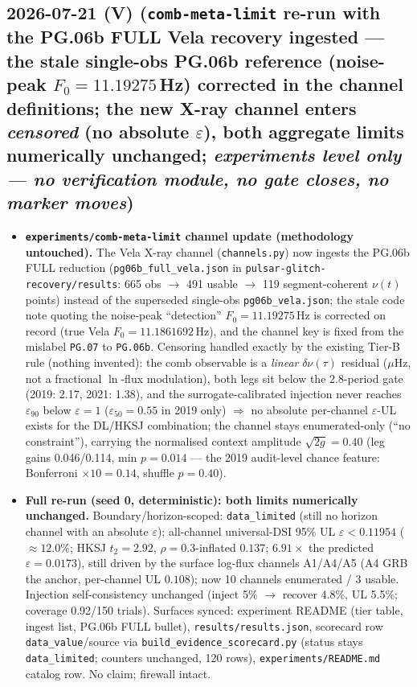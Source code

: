 \documentclass[11pt]{article}
\begin{document}
\subsection*{2026-07-21 (V) (\texttt{comb-meta-limit} re-run with the PG.06b FULL Vela recovery ingested --- the stale single-obs PG.06b reference (noise-peak $F_0=11.19275$\,Hz) corrected in the channel definitions; the new X-ray channel enters \emph{censored} (no absolute $\varepsilon$), both aggregate limits numerically unchanged; \emph{experiments level only --- no verification module, no gate closes, no marker moves})}
\begin{itemize}[leftmargin=1.5em]
\item \textbf{\texttt{experiments/comb-meta-limit} channel update (methodology untouched).} The Vela
X-ray channel (\texttt{channels.py}) now ingests the PG.06b FULL reduction
(\texttt{pg06b\_full\_vela.json} in \texttt{pulsar-glitch-recovery/results}: 665 obs $\to$ 491
usable $\to$ 119 segment-coherent $\nu(t)$ points) instead of the superseded single-obs
\texttt{pg06b\_vela.json};
the stale code note quoting the noise-peak ``detection'' $F_0=11.19275$\,Hz is corrected on record
(true Vela $F_0=11.1861692$\,Hz), and the channel key is fixed from the mislabel \texttt{PG.07} to
\texttt{PG.06b}. Censoring handled exactly by the existing Tier-B rule (nothing invented): the comb
observable is a \emph{linear} $\delta\nu(\tau)$ residual ($\mu$Hz, not a fractional $\ln$-flux
modulation), both legs sit below the 2.8-period gate (2019: 2.17, 2021: 1.38), and the
surrogate-calibrated injection never reaches $\varepsilon_{90}$ below $\varepsilon=1$
($\varepsilon_{50}=0.55$ in 2019 only) $\Rightarrow$ no absolute per-channel $\varepsilon$-UL exists
for the DL/HKSJ combination; the channel stays enumerated-only (``no constraint''), carrying the
normalised context amplitude $\sqrt{2g}=0.40$ (leg gains 0.046/0.114, min $p=0.014$ --- the 2019
audit-level chance feature: Bonferroni $\times10=0.14$, shuffle $p=0.40$).
\item \textbf{Full re-run (seed 0, deterministic): both limits numerically unchanged.}
Boundary/horizon-scoped: \texttt{data\_limited} (still no horizon channel with an absolute
$\varepsilon$); all-channel universal-DSI 95\% UL $\varepsilon<0.11954$ ($\approx12.0\%$; HKSJ
$t_2=2.92$, $\rho=0.3$-inflated $0.137$; $6.91\times$ the predicted $\varepsilon=0.0173$), still
driven by the surface log-flux channels A1/A4/A5 (A4 GRB the anchor, per-channel UL $0.108$); now 10
channels enumerated / 3 usable. Injection self-consistency unchanged (inject 5\% $\to$ recover
4.8\%, UL 5.5\%; coverage 0.92/150 trials). Surfaces synced: experiment README (tier table, ingest
list, PG.06b FULL bullet), \texttt{results/results.json}, scorecard row \texttt{data\_value}/source
via \texttt{build\_evidence\_scorecard.py} (status stays \texttt{data\_limited}; counters unchanged,
120 rows), \texttt{experiments/README.md} catalog row. No claim; firewall intact.
\end{itemize}
\end{document}
